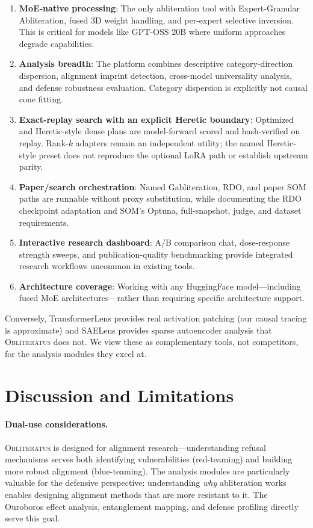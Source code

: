 \documentclass[11pt]{article}
\begin{document}
\begin{enumerate}[leftmargin=*]
    \item \textbf{MoE-native processing}: The only abliteration tool with Expert-Granular Abliteration, fused 3D weight handling, and per-expert selective inversion. This is critical for models like GPT-OSS 20B where uniform approaches degrade capabilities.
    \item \textbf{Analysis breadth}: The platform combines descriptive category-direction dispersion, alignment imprint detection, cross-model universality analysis, and defense robustness evaluation. Category dispersion is explicitly not causal cone fitting.
    \item \textbf{Exact-replay search with an explicit Heretic boundary}: Optimized and Heretic-style dense plans are model-forward scored and hash-verified on replay. Rank-$k$ adapters remain an independent utility; the named Heretic-style preset does not reproduce the optional LoRA path or establish upstream parity.
    \item \textbf{Paper/search orchestration}: Named Gabliteration, RDO, and paper SOM paths are runnable without proxy substitution, while documenting the RDO checkpoint adaptation and SOM's Optuna, full-snapshot, judge, and dataset requirements.
    \item \textbf{Interactive research dashboard}: A/B comparison chat, dose-response strength sweeps, and publication-quality benchmarking provide integrated research workflows uncommon in existing tools.
    \item \textbf{Architecture coverage}: Working with any HuggingFace model---including fused MoE architectures---rather than requiring specific architecture support.
\end{enumerate}

Conversely, TransformerLens provides real activation patching (our causal tracing is approximate) and SAELens provides sparse autoencoder analysis that \textsc{Obliteratus} does not. We view these as complementary tools, not competitors, for the analysis modules they excel at.

\section{Discussion and Limitations}
\label{sec:discussion}

\paragraph{Dual-use considerations.}
\textsc{Obliteratus} is designed for alignment research---understanding refusal mechanisms serves both identifying vulnerabilities (red-teaming) and building more robust alignment (blue-teaming). The analysis modules are particularly valuable for the defensive perspective: understanding \emph{why} abliteration works enables designing alignment methods that are more resistant to it. The Ouroboros effect analysis, entanglement mapping, and defense profiling directly serve this goal.
\end{document}

